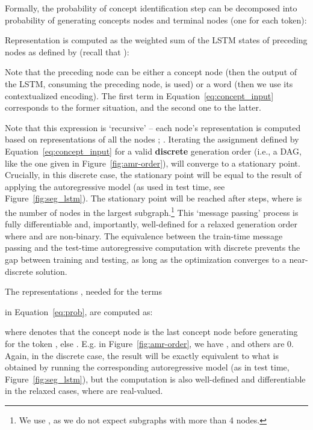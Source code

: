 \documentclass[11pt]{article}
\begin{document}
\label{sec:seg_concept_generation}
Formally, the probability of concept identification step can be decomposed into probability of generating  concepts nodes and  terminal nodes (one for each token):

Representation
 is computed as the weighted sum of the LSTM states of preceding nodes as defined by  (recall that ):

Note that the preceding node can be either a concept node (then the output of the LSTM, consuming the preceding node, is used)
or a word (then we use its contextualized encoding). The first term in Equation~\ref{eq:concept_input} corresponds to the former situation, and the second one to the latter.   

Note that this expression is `recursive' -- each node's representation  is computed based on representations of all the nodes ; . Iterating  the assignment defined by Equation~\ref{eq:concept_input} 
  for a valid {\bf discrete} generation order (i.e., a DAG, like the one given in Figure~\ref{fig:amr-order}), 
 will converge to a stationary point. Crucially, in this discrete case, the stationary point will be equal to the result of applying the autoregressive model (as used in test time, see  Figure~\ref{fig:seg_lstm}). The stationary point will be reached after  steps, where  is the number of nodes in the largest subgraph.\footnote{We use  , as we do not expect subgraphs with more than 4 nodes.} 
 This `message passing' process is fully differentiable and, importantly, well-defined for a relaxed generation order where  and   are non-binary.  The equivalence between the train-time message passing and the test-time autoregressive computation with discrete 
prevents the gap between training and testing, as long as the optimization  converges to a near-discrete solution.
 






The representations ,
needed for the terms
 
in Equation~\ref{eq:prob}, are computed as:

where   denotes that the concept node  is the last concept node before generating  for the token , else . E.g. in Figure~\ref{fig:amr-order}, we have , and others are 0.
Again, in the discrete case, the result will be exactly equivalent to what is obtained by running the corresponding autoregressive model (as in test time,   Figure~\ref{fig:seg_lstm}), but the computation is also well-defined and differentiable in the relaxed cases, where  are real-valued.
\end{document}
